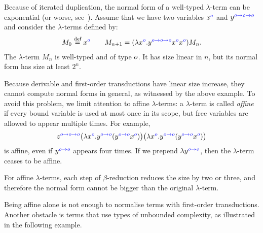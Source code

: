 \begin{example}\label{ex:exponential}
    Because of iterated duplication, the normal form of a well-typed $\lambda$-term can be exponential (or worse, see~\cite[Section 3.6]{sorensen_lectures_2006}). Assume that we have two variables ${x}^{\color{blue}{o}}$ and ${y}^{\color{blue}{o\to o\to o}}$ and consider the $\lambda$-terms defined by:
    \begin{align*}
        M_0 \stackrel{\text{def}}= {x}^{\color{blue}{o}} \qquad M_{n+1} = (\lambda {x}^{\color{blue}{o}} . {y}^{\color{blue}{o\to o\to o}}  {x}^{\color{blue}{o}} {x}^{\color{blue}{o}})M_n.
    \end{align*}
    The $\lambda$-term $M_n$ is well-typed and of type $o$. It has size linear in $n$, but its normal form has size at least $2^n$. 
\end{example}
Because derivable and first-order transductions have linear size increase, they cannot compute normal forms in general, as  witnessed by the above example. To  avoid this problem, we  limit attention to affine $\lambda$-terms: a $\lambda$-term is called \emph{affine} if every bound variable is used at most once in its scope, but free variables are allowed to appear multiple times.  For example, 
\begin{align*}
{z}^{\color{blue}{o\to o\to o}} \big(\lambda {x}^{\color{blue}{o}}.  {y}^{\color{blue}{o\to o}} ({y}^{\color{blue}{o\to o}}  {x}^{\color{blue}{o}})\big) \big(\lambda {x}^{\color{blue}{o}}.  {y}^{\color{blue}{o\to o}} ({y}^{\color{blue}{o\to o}}  {x}^{\color{blue}{o}})\big)
\end{align*}
is affine, even if ${y}^{\color{blue}{o\to o}}$ appears four times. If we prepend $\lambda {y}^{\color{blue}{o\to o}}$, then the $\lambda$-term ceases to be affine.

For affine $\lambda$-terms, each step of $\beta$-reduction reduces the size by two or three, and therefore the normal form cannot be bigger than the original $\lambda$-term. 

Being affine  alone is not enough to normalise terms with first-order transductions. Another obstacle is terms that use types of unbounded complexity, as illustrated in the following example. 

